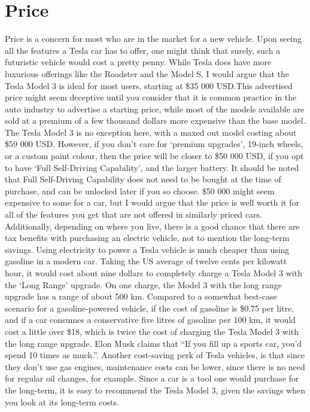 \documentclass{article}
\begin{document}
  \section{Price}
  Price is a concern for most who are in the market for a new vehicle. Upon seeing
  all the features a Tesla car has to offer, one might think that surely,
  such a futuristic vehicle would cost a pretty penny. While Tesla does have
  more luxurious offerings like the Roadster and the Model S, I would argue that the
  Tesla Model 3 is ideal for most users, starting at \$35 000 USD.\@ This advertised
  price might seem deceptive until you consider that it is common practice
  in the auto industry to advertise a starting price, while most of the models available
  are sold at a premium of a few thousand dollars more expensive than the base model. The
  Tesla Model 3 is no exception here, with a maxed out model costing about
  \$59 000 USD\cite{maxprice}. However, if you don't care for `premium upgrades',
  19-inch wheels, or a custom paint colour, then the price will be closer to
  \$50 000 USD, if you opt to have `Full Self-Driving Capability', and the larger
  battery. It should be noted that Full Self-Driving Capability does not need to be
  bought at the time of purchase, and can be unlocked later if you so choose.
  \$50 000 might seem expensive to some for a car, but I would argue that the price is well worth
  it for all of the features you get that are not offered in similarly priced cars.
  Additionally, depending on where you live, there is a good chance that there are
  tax benefits with purchasing an electric vehicle, not to mention the long-term savings.
  Using electricity to power a Tesla vehicle is much cheaper than using gasoline in
  a modern car. Taking the US average of twelve cents per kilowatt hour, it would
  cost about nine dollars to completely charge a Tesla Model 3 with the `Long Range'
  upgrade. On one charge, the Model 3 with the long range upgrade has a range of about
  500 km\cite{500km}. Compared to a somewhat best-case scenario for a gasoline-powered vehicle,
  if the cost of gasoline is \$0.75 per litre\cite{75cents}, and if a car consumes a conservative five
  litres of gasoline per 100 km\cite{priusmpg}, it would cost a little over \$18, which is
  twice the cost of charging the Tesla Model 3 with the long range upgrade. Elon Musk claims that
  ``If you fill up a sports car, you'd spend 10 times as much.''\cite{rosoff_elon_nodate}. Another cost-saving
  perk of Tesla vehicles, is that since they don't use gas engines, maintenance costs
  can be lower, since there is no need for regular oil changes, for example.\cite{oilchange}
  Since a car is a tool one would purchase for the long-term, it is easy to
  recommend the Tesla Model 3, given the savings when you look at its long-term costs.
\end{document}
